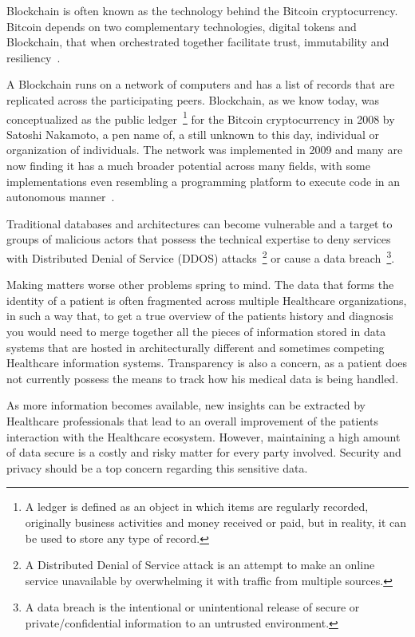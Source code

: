 Blockchain is often known as the technology behind the Bitcoin cryptocurrency.
Bitcoin depends on two complementary technologies, digital tokens and
Blockchain, that when orchestrated together facilitate trust, immutability and
resiliency~\cite{Evans2016}.

A Blockchain runs on a network of computers and has a list of records that are
replicated across the participating peers. Blockchain, as we know today, was
conceptualized as the public ledger~\footnote{A ledger is defined as an object
in which items are regularly recorded, originally business activities and money
received or paid, but in reality, it can be used to store any type of record.}
for the Bitcoin cryptocurrency in 2008 by Satoshi Nakamoto, a pen name of, a
still unknown to this day, individual or organization of individuals. The
network was implemented in 2009 and many are now finding it has a much broader
potential across many fields, with some implementations even resembling a
programming platform to execute code in an autonomous
manner~\cite{Nakamoto2008}.

Traditional databases and architectures can become vulnerable and a target to
groups of malicious actors that possess the technical expertise to deny
services with Distributed Denial of Service (DDOS) attacks~\footnote{A
Distributed Denial of Service attack is an attempt to make an online service
unavailable by overwhelming it with traffic from multiple sources.} or cause a
data breach~\footnote{A data breach is the intentional or unintentional release
of secure or private/confidential information to an untrusted environment.}. 

Making matters worse other problems spring to mind. The data that forms the
identity of a patient is often fragmented across multiple Healthcare
organizations, in such a way that, to get a true overview of the patients
history and diagnosis you would need to merge together all the pieces of
information stored in data systems that are hosted in architecturally different
and sometimes competing Healthcare information systems. Transparency is also a
concern, as a patient does not currently possess the means to track how his
medical data is being handled.

As more information becomes available, new insights can be extracted by
Healthcare professionals that lead to an overall improvement of the patients
interaction with the Healthcare ecosystem. However, maintaining a high amount
of data secure is a costly and risky matter for every party involved. Security
and privacy should be a top concern regarding this sensitive data. 

